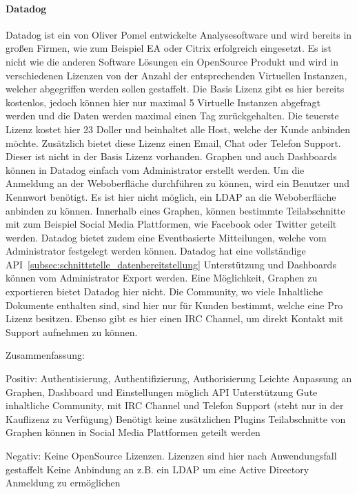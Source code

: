 \paragraph{Datadog}
\label{paragraph:datadog}
Datadog ist ein von Oliver Pomel entwickelte Analysesoftware und wird bereits
in großen Firmen, wie zum Beispiel EA oder Citrix erfolgreich eingesetzt. Es
ist nicht wie die anderen Software Lösungen ein OpenSource Produkt und wird in
verschiedenen Lizenzen von der Anzahl der entsprechenden Virtuellen Instanzen,
welcher abgegriffen werden sollen gestaffelt. Die Basis Lizenz gibt es hier
bereits kostenlos, jedoch können hier nur maximal 5 Virtuelle Instanzen
abgefragt werden und die Daten werden maximal einen Tag zurückgehalten. Die
teuerste Lizenz kostet hier 23 Doller und beinhaltet alle Host, welche der Kunde
anbinden möchte. Zusätzlich bietet diese Lizenz einen Email, Chat oder Telefon
Support. Dieser ist nicht in der Basis Lizenz vorhanden. Graphen und auch
Dashboards können in Datadog einfach vom Administrator erstellt werden. Um die
Anmeldung an der Weboberfläche durchführen zu können, wird ein Benutzer und
Kennwort benötigt. Es ist hier nicht möglich, ein LDAP an die Weboberfläche
anbinden zu können. Innerhalb eines Graphen, können bestimmte Teilabschnitte mit
zum Beispiel Social Media Plattformen, wie Facebook oder Twitter geteilt werden.
Datadog bietet zudem eine Eventbasierte Mitteilungen, welche vom Administrator
festgelegt werden können. Datadog hat eine vollständige
API~\ref{subsec:schnittstelle_datenbereitstellung} Unterstützung und Dashboards
können vom Administrator Export werden. Eine Möglichkeit, Graphen zu exportieren
bietet Datadog hier nicht. Die Community, wo viele Inhaltliche Dokumente
enthalten sind, sind hier nur für Kunden bestimmt, welche eine Pro Lizenz
besitzen. Ebenso gibt es hier einen \gls{IRC Channel}, um direkt Kontakt mit Support
aufnehmen zu können.

Zusammenfassung:

\begin{outline}
  Positiv:
  \1 Authentisierung, Authentifizierung, Authorisierung
  \1 Leichte Anpassung an Graphen, Dashboard und Einstellungen möglich
  \1 API Unterstützung
  \1 Gute inhaltliche Community, mit IRC Channel und Telefon Support (steht
  nur in der Kauflizenz zu Verfügung)
  \1 Benötigt keine zusätzlichen Plugins
  \1 Teilabschnitte von Graphen können in Social Media Plattformen geteilt
  werden

  Negativ:
  \1 Keine OpenSource Lizenzen. Lizenzen sind hier nach Anwendungsfall
  gestaffelt
  \1 Keine Anbindung an z.B. ein LDAP um eine Active Directory Anmeldung zu
  ermöglichen
\end{outline}

